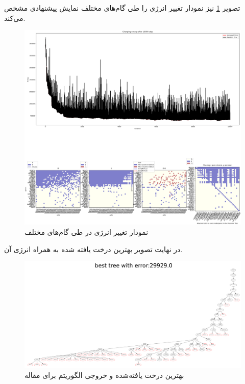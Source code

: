 تصویر \ref{fig:Gene_ٍenergy_chart} نیز نمودار تغییر انرژی را طی گام‌های مختلف نمایش پیشنهادی مشخص می‌کند.
\begin{figure}[!ht]
	\centering
	\includegraphics[width=\textwidth]{img/res/sn_benchmark}
	\caption{نمودار تغییر انرژی در طی گام‌های مختلف}
	\label{fig:Gene_ٍenergy_chart}
\end{figure}
در نهایت تصویر بهترین درخت یافته شده به همراه انرژی آن.
\begin{figure}[!ht]
	\centering
	\includegraphics[width=\textwidth]{img/res/sn_best_tree}
	\caption{بهترین درخت یافته‌شده و خروجی الگوریتم برای مقاله }
	\label{fig:Gene_ٍbest_tree}
\end{figure}

